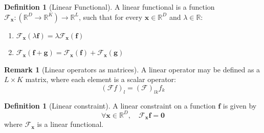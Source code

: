 \documentclass[12pt,a4paper,twoside]{report}
\theoremstyle{definition}
\newtheorem{remark}[thm]{Remark}
\newtheorem{definition}[thm]{Definition}
\begin{document}
\begin{definition}[Linear Functional]\label{linearfunctional}
	 A linear functional is a function $\mathscr F_\mathbf x: (\mathbb{R}^D\to\mathbb{R}^K)\to\mathbb{R}^L$, such that for every $\mathbf x\in \mathbb{R}^D$ and $\lambda \in \mathbb{R}$:
	\begin{enumerate}
		\item $\mathscr{F}_{\mathbf x}(\lambda \mathbf f) = \lambda \mathscr{F}_\mathbf x (\mathbf f)$
		\item $\mathscr{F}_\mathbf x(\mathbf f + \mathbf g) = \mathscr{F}_\mathbf x(\mathbf f) + \mathscr{F}_\mathbf x(\mathbf g)$
	\end{enumerate}
\end{definition}

\begin{remark}[Linear operators as matrices]\label{matrix}
	A linear operator may be defined as a $L\times K$ matrix, where each element is a scalar operator:
	$$(\mathscr F f)_{l} = (\mathscr F)_{lk} f_k$$
\end{remark}


\begin{definition}[Linear constraint]
	A linear constraint on a function $\mathbf f$ is given by $$\forall \mathbf x\in \mathbb{R}^D,\quad \mathscr F_\mathbf x \mathbf f =\mathbf 0$$ where $\mathscr F_\mathbf x$ is a linear functional.
\end{definition}
\end{document}
